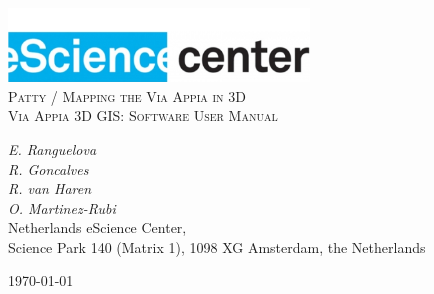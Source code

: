 \documentclass[a4paper,11pt]{article}
\begin{document}
\begin{titlepage}
\begin{center}
\includegraphics[width=0.6\textwidth]{fig/logo}\\[3cm]    
\textsc{\LARGE Patty / Mapping the Via Appia in 3D}\\[0.5cm]
\textsc{\large Via Appia 3D GIS: Software User Manual}\\[0.5cm]
\vfill
\end{center}
{\large
\emph{E. Ranguelova} \\
\emph{R. Goncalves } \\
\emph{R. van Haren } \\
\emph{O. Martinez-Rubi } \\
}
{\large
{Netherlands eScience Center, \\
Science Park 140 (Matrix 1), 1098 XG Amsterdam, the Netherlands\\
}
}
\begin{center}
{\large \today}
\end{center}
\end{titlepage}

\tableofcontents

\newpage









\end{document}
